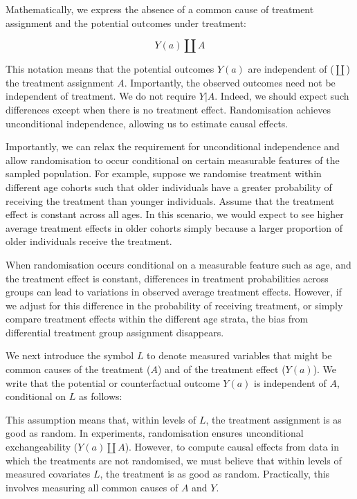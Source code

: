 \documentclass[
  singlecolumn]{article}
\begin{document}
Mathematically, we express the absence of a common cause of treatment
assignment and the potential outcomes under treatment:

\[
Y(a) \coprod A
\]

This notation means that the potential outcomes \(Y(a)\) are independent
of (\(\coprod\)) the treatment assignment \(A\). Importantly, the
observed outcomes need not be independent of treatment. We do not
require \(Y|A\). Indeed, we should expect such differences except when
there is no treatment effect. Randomisation achieves unconditional
independence, allowing us to estimate causal effects.

Importantly, we can relax the requirement for unconditional independence
and allow randomisation to occur conditional on certain measurable
features of the sampled population. For example, suppose we randomise
treatment within different age cohorts such that older individuals have
a greater probability of receiving the treatment than younger
individuals. Assume that the treatment effect is constant across all
ages. In this scenario, we would expect to see higher average treatment
effects in older cohorts simply because a larger proportion of older
individuals receive the treatment.

When randomisation occurs conditional on a measurable feature such as
age, and the treatment effect is constant, differences in treatment
probabilities across groups can lead to variations in observed average
treatment effects. However, if we adjust for this difference in the
probability of receiving treatment, or simply compare treatment effects
within the different age strata, the bias from differential treatment
group assignment disappears.

We next introduce the symbol \(L\) to denote measured variables that
might be common causes of the treatment (\(A\)) and of the treatment
effect (\(Y(a)\)). We write that the potential or counterfactual outcome
\(Y(a)\) is independent of \(A\), conditional on \(L\) as follows:

This assumption means that, within levels of \(L\), the treatment
assignment is as good as random. In experiments, randomisation ensures
unconditional exchangeability (\(Y(a) \coprod  A\)). However, to compute
causal effects from data in which the treatments are not randomised, we
must believe that within levels of measured covariates \(L\), the
treatment is as good as random. Practically, this involves measuring all
common causes of \(A\) and \(Y\).
\end{document}
